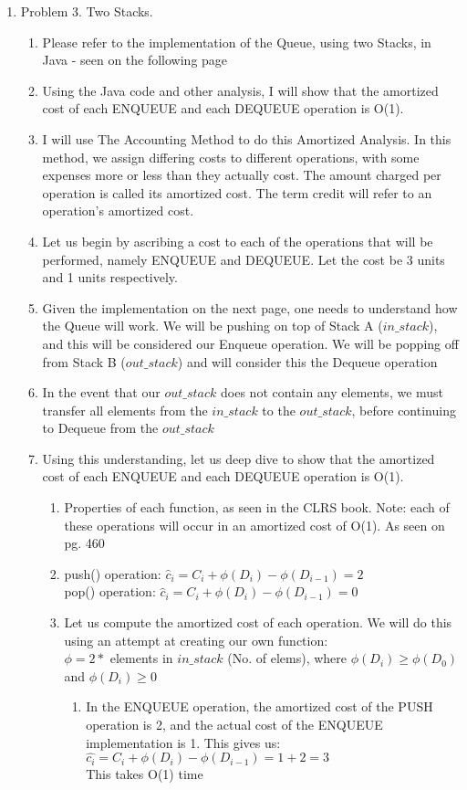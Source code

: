 \documentclass[11pt]{article}
\begin{document}
\begin{enumerate}
\item Problem 3. Two Stacks.
    \begin{enumerate}
        \item Please refer to the implementation of the Queue, using two Stacks, in Java - seen on the following page
        \item Using the Java code and other analysis, I will show that the amortized cost of each ENQUEUE and each DEQUEUE operation is O(1).
        \item I will use The Accounting Method to do this Amortized Analysis. In this method, we assign differing costs to different operations, with some expenses more or less than they actually cost. The amount charged per operation is called its amortized cost. The term credit will refer to an operation's amortized cost.
        \item Let us begin by ascribing a cost to each of the operations that will be performed, namely ENQUEUE and DEQUEUE. Let the cost be 3 units and 1 units respectively. 
        \item Given the implementation on the next page, one needs to understand how the Queue will work. We will be pushing on top of Stack A ($in\_stack$), and this will be considered our Enqueue operation. We will be popping off from Stack B ($out\_stack$) and will consider this the Dequeue operation
        \item In the event that our $out\_stack$ does not contain any elements, we must transfer all elements from the $in\_stack$ to the $out\_stack$, before continuing to Dequeue from the $out\_stack$
        \item Using this understanding, let us deep dive to show that the amortized cost of each ENQUEUE and each DEQUEUE operation is O(1).
        \begin{enumerate}
            \item Properties of each function, as seen in the CLRS book. Note: each of these operations will occur in an amortized cost of O(1). As seen on pg. 460
            \item push() operation: $\hat{c}_i = C_i + \phi (D_i) - \phi (D_{i-1}) = 2$\\
            pop() operation: $\hat{c}_i = C_i + \phi (D_i) - \phi (D_{i-1}) = 0$
            \item Let us compute the amortized cost of each operation. We will do this using an attempt at creating our own function:\\
            $\phi = 2 * $ elements in $in\_stack$ (No. of elems), where $\phi(D_i) \geq \phi(D_0)$ and $\phi (D_i) \geq 0$
            \begin{enumerate}
                \item In the ENQUEUE operation, the amortized cost of the PUSH operation is 2, and the actual cost of the ENQUEUE implementation is 1. This gives us:\\ 
                $\hat{c_i} = C_i + \phi(D_i) - \phi(D_{i-1}) = 1+2 = 3$\\ 
                This takes O(1) time
                

\end{enumerate}
\end{enumerate}
\end{enumerate}
\end{enumerate}
\end{document}
